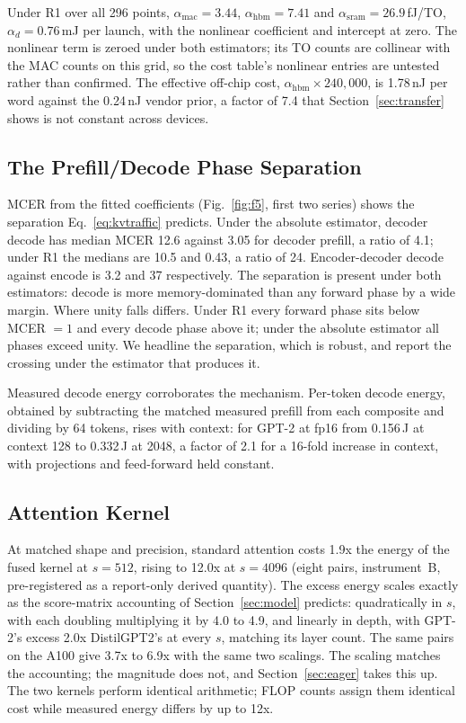 \documentclass[conference]{IEEEtran}
\begin{document}
Under R1 over all 296 points, $\alpha_{\mathrm{mac}} = 3.44$,
$\alpha_{\mathrm{hbm}} = 7.41$ and $\alpha_{\mathrm{sram}} = 26.9$\,fJ/TO,
$\alpha_d = 0.76$\,mJ per launch, with the nonlinear coefficient and
intercept at zero. The nonlinear term is zeroed under both estimators; its
TO counts are collinear with the MAC counts on this grid, so the cost
table's nonlinear entries are untested rather than confirmed. The effective
off-chip cost, $\alpha_{\mathrm{hbm}} \times 240{,}000$, is 1.78\,nJ per
word against the 0.24\,nJ vendor prior, a factor of 7.4 that
Section~\ref{sec:transfer} shows is not constant across devices.

\subsection{The Prefill/Decode Phase Separation}
\label{sec:phasesep4090}

MCER from the fitted coefficients (Fig.~\ref{fig:f5}, first two series)
shows the separation Eq.~\ref{eq:kvtraffic} predicts. Under the absolute
estimator, decoder decode has median MCER 12.6 against 3.05 for decoder
prefill, a ratio of 4.1; under R1 the medians are 10.5 and 0.43, a ratio of
24. Encoder-decoder decode against encode is 3.2 and 37 respectively. The
separation is present under both estimators: decode is more
memory-dominated than any forward phase by a wide margin. Where unity falls
differs. Under R1 every forward phase sits below MCER $= 1$ and every decode
phase above it; under the absolute estimator all phases exceed unity. We
headline the separation, which is robust, and report the crossing under the
estimator that produces it.

Measured decode energy corroborates the mechanism. Per-token decode energy,
obtained by subtracting the matched measured prefill from each composite
and dividing by 64 tokens, rises with context: for GPT-2 at fp16 from
0.156\,J at context 128 to 0.332\,J at 2048, a factor of 2.1 for a 16-fold
increase in context, with projections and feed-forward held constant.

\subsection{Attention Kernel}
\label{sec:kernel4090}

At matched shape and precision, standard attention costs 1.9x the energy of
the fused kernel at $s = 512$, rising to 12.0x at $s = 4096$ (eight pairs,
instrument~B, pre-registered as a report-only derived quantity). The excess
energy scales exactly as the score-matrix accounting of
Section~\ref{sec:model} predicts: quadratically in $s$, with each doubling
multiplying it by 4.0 to 4.9, and linearly in depth, with GPT-2's excess
2.0x DistilGPT2's at every $s$, matching its layer count. The same pairs on
the A100 give 3.7x to 6.9x with the same two scalings. The scaling matches
the accounting; the magnitude does not, and Section~\ref{sec:eager} takes
this up. The two kernels
perform identical arithmetic; FLOP counts assign them identical cost while
measured energy differs by up to 12x.
\end{document}
